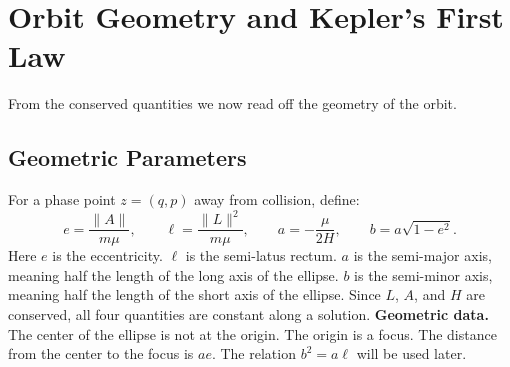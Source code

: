\chapter{Orbit Geometry and Kepler's First Law}

From the conserved quantities we now read off the geometry of the orbit.

\section{Geometric Parameters}

\begin{definition}\label{def:ellipse-data}
For a phase point $z = (q, p)$ away from collision, define:
\[
  e = \frac{\|A\|}{m\mu},
  \qquad
  \ell = \frac{\|L\|^2}{m\mu},
  \qquad
  a = -\frac{\mu}{2H},
  \qquad
  b = a\sqrt{1-e^2}.
\]
Here $e$ is the eccentricity.
$\ell$ is the semi-latus rectum.
$a$ is the semi-major axis, meaning half the length of the long axis of the ellipse.
$b$ is the semi-minor axis, meaning half the length of the short axis of the ellipse.
Since $L$, $A$, and $H$ are conserved, all four quantities are constant along a solution.
\medskip
\noindent\textbf{Geometric data.}
The center of the ellipse is not at the origin.
The origin is a focus.
The distance from the center to the focus is $ae$.
The relation $b^2 = a\ell$ will be used later.

\leanok
\end{definition}


